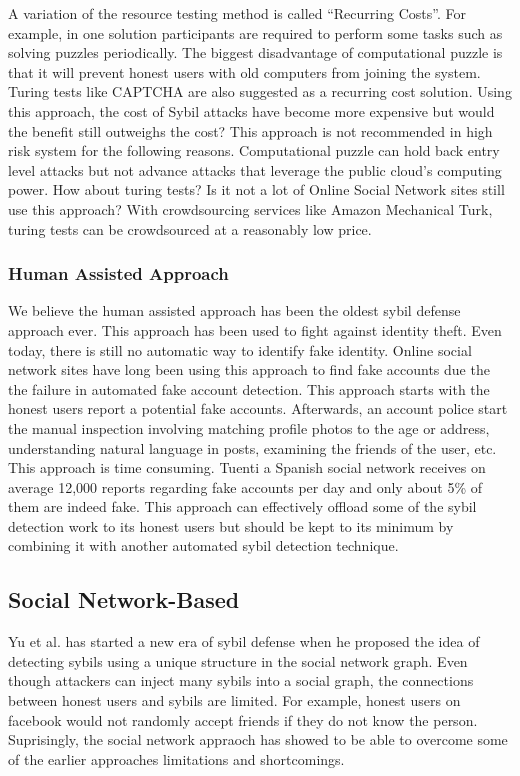 \documentclass[conference]{IEEEtran}
\begin{document}
A variation of the resource testing method is called “Recurring Costs”. For example, in one solution participants are required to perform some tasks such as solving puzzles\cite{Borisov06CPS} periodically. The biggest disadvantage of computational puzzle is that it will prevent honest users with old computers from joining the system. Turing tests like CAPTCHA are also suggested as a recurring cost solution\cite{Ahn03CUH}. Using this approach, the cost of Sybil attacks have become more expensive but would the benefit still outweighs the cost? This approach is not recommended in high risk system for the following reasons. Computational puzzle can hold back entry level attacks but not advance attacks that leverage the public cloud’s computing power. How about turing tests? Is it not a lot of Online Social Network sites still use this approach? With crowdsourcing services like Amazon Mechanical Turk, turing tests can be crowdsourced at a reasonably low price.

\subsubsection{Human Assisted Approach}
We believe the human assisted approach has been the oldest sybil defense approach ever. 
This approach has been used to fight against identity theft. Even today, there is still no automatic way to identify fake identity. 
Online social network sites have long been using this approach to find fake accounts due the the failure in automated fake account detection. 
This approach starts with the honest users report a potential fake accounts. 
Afterwards, an account police start the manual inspection involving matching profile photos to the age or address, understanding natural language in posts, 
examining the friends of the user, etc. 
This approach is time consuming. 
Tuenti a Spanish social network receives on average 12,000 reports regarding fake accounts per day and only about 5\% of them are indeed fake. 
This approach can effectively offload some of the sybil detection work to its honest users but should be kept to its minimum by combining it with another 
automated sybil detection technique.

\subsection{Social Network-Based}
Yu et al. has started a new era of sybil defense when he proposed the idea of detecting sybils using a unique structure in the social network graph. Even though attackers can inject many sybils into a social graph, the connections between honest users and sybils are limited\cite{Yu08SybilGuard}. For example, honest users on facebook would not randomly accept friends if they do not know the person. Suprisingly, the social network appraoch has showed to be able to overcome some of the earlier approaches limitations and shortcomings.
\end{document}
